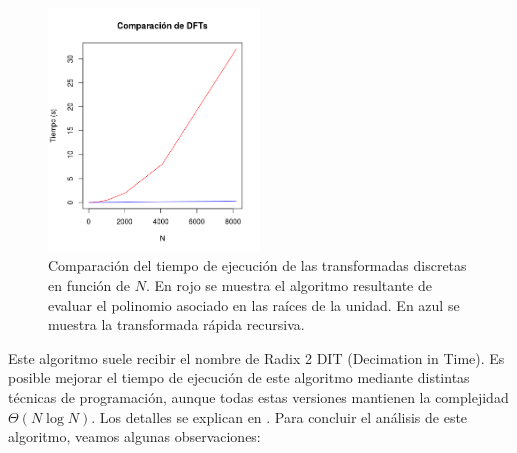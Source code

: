\documentclass{article}
\begin{document}
\begin{figure}[h]
\centering
\includegraphics[width=0.5\textwidth]{images/dft_comp.png}
\caption{Comparación del tiempo de ejecución de las transformadas discretas en función de $N$. En rojo se muestra el algoritmo resultante de evaluar el polinomio asociado en las raíces de la unidad. En azul se muestra la transformada rápida recursiva.} \label{fig:nlogn_vs_n2}
\end{figure}

Este algoritmo suele recibir el nombre de Radix 2 DIT (Decimation in Time). Es posible mejorar el tiempo de ejecución de este algoritmo mediante distintas técnicas de programación, aunque todas estas versiones mantienen la complejidad $\Theta(N\log N)$. Los detalles se explican en \cite{cormen2009introduction}. Para concluir el análisis de este algoritmo, veamos algunas observaciones:
\end{document}
